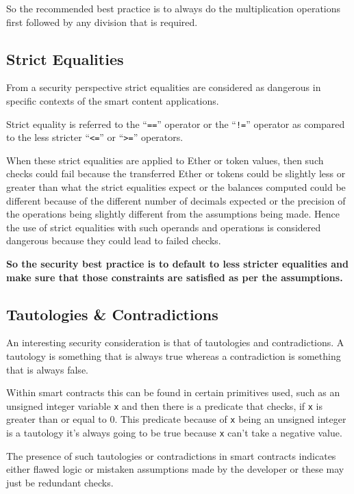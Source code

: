 So the recommended best practice is to always do the multiplication
operations first followed by any division that is required.

\subsection{Strict Equalities}\label{strict-equalities}

From a security perspective strict equalities are considered as
dangerous in specific contexts of the smart content applications.

Strict equality is referred to the ``\texttt{==}'' operator or the
``\texttt{!=}'' operator as compared to the less stricter
``\texttt{\textless{}=}'' or ``\texttt{\textgreater{}=}'' operators.

When these strict equalities are applied to Ether or token values, then
such checks could fail because the transferred Ether or tokens could be
slightly less or greater than what the strict equalities expect or the
balances computed could be different because of the different number of
decimals expected or the precision of the operations being slightly
different from the assumptions being made. Hence the use of strict
equalities with such operands and operations is considered dangerous
because they could lead to failed checks.

\textbf{So the security best practice is to default to less stricter
equalities and make sure that those constraints are satisfied as per the
assumptions.}

\subsection{Tautologies \&
Contradictions}\label{tautologies-contradictions}

An interesting security consideration is that of tautologies and
contradictions. A tautology is something that is always true whereas a
contradiction is something that is always false.

Within smart contracts this can be found in certain primitives used,
such as an unsigned integer variable \texttt{x} and then there is a
predicate that checks, if \texttt{x} is greater than or equal to 0. This
predicate because of \texttt{x} being an unsigned integer is a tautology
it's always going to be true because \texttt{x} can't take a negative
value.

The presence of such tautologies or contradictions in smart contracts
indicates either flawed logic or mistaken assumptions made by the
developer or these may just be redundant checks.

